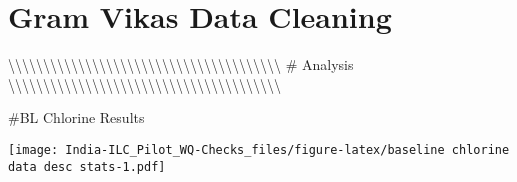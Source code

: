 \documentclass[
]{article}
\begin{document}
\newpage

\hypertarget{gram-vikas-data-cleaning}{%
\section{Gram Vikas Data Cleaning}\label{gram-vikas-data-cleaning}}

\textbackslash\textbackslash\textbackslash\textbackslash\textbackslash\textbackslash\textbackslash\textbackslash\textbackslash\textbackslash\textbackslash\textbackslash\textbackslash\textbackslash\textbackslash\textbackslash\textbackslash\textbackslash\textbackslash\textbackslash\textbackslash\textbackslash\textbackslash\textbackslash\textbackslash\textbackslash\textbackslash\textbackslash\textbackslash\textbackslash\textbackslash\textbackslash\textbackslash\textbackslash\textbackslash\textbackslash\textbackslash\textbackslash\textbackslash{}
\newpage \# Analysis
\textbackslash\textbackslash\textbackslash\textbackslash\textbackslash\textbackslash\textbackslash\textbackslash\textbackslash\textbackslash\textbackslash\textbackslash\textbackslash\textbackslash\textbackslash\textbackslash\textbackslash\textbackslash\textbackslash\textbackslash\textbackslash\textbackslash\textbackslash\textbackslash\textbackslash\textbackslash\textbackslash\textbackslash\textbackslash\textbackslash\textbackslash\textbackslash\textbackslash\textbackslash\textbackslash\textbackslash\textbackslash\textbackslash\textbackslash{}

\#BL Chlorine Results

\texttt{[image: India-ILC\_Pilot\_WQ-Checks\_files/figure-latex/baseline chlorine data desc stats-1.pdf]}
\end{document}
